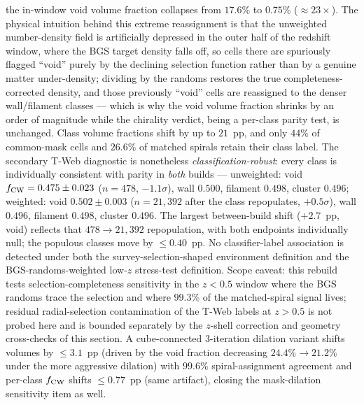 \documentclass[aps,prd,twocolumn,superscriptaddress,showpacs,preprintnumbers,nofootinbib,longbibliography,floatfix]{revtex4-2}
\begin{document}
the in-window void volume fraction collapses from $17.6\%$ to $0.75\%$
(${\approx}23\times$). The physical intuition behind this extreme
reassignment is that the unweighted number-density field is artificially
depressed in the outer half of the redshift window, where the BGS target
density falls off, so cells there are spuriously flagged ``void'' purely
by the declining selection function rather than by a genuine matter
under-density; dividing by the randoms restores the true completeness-
corrected density, and those previously ``void'' cells are reassigned to
the denser wall/filament classes --- which is why the void volume
fraction shrinks by an order of magnitude while the chirality verdict,
being a per-class parity test, is unchanged. Class volume fractions shift by up to $21$~pp,
and only $44\%$ of common-mask cells and $26.6\%$ of matched spirals
retain their class label. The secondary T-Web diagnostic is nonetheless
\emph{classification-robust}: every class is individually consistent
with parity in \emph{both} builds --- unweighted: void
$f_{\rm CW} = 0.475 \pm 0.023$ ($n=478$, $-1.1\sigma$), wall $0.500$,
filament $0.498$, cluster $0.496$; weighted: void $0.502 \pm 0.003$
($n = 21{,}392$ after the class repopulates, $+0.5\sigma$), wall
$0.496$, filament $0.498$, cluster $0.496$. The largest between-build
shift ($+2.7$~pp, void) reflects that $478 \to 21{,}392$ repopulation,
with both endpoints individually null; the populous classes move by
$\le 0.40$~pp. No classifier-label association is detected
under both the survey-selection-shaped environment definition and the
BGS-randoms-weighted low-$z$ stress-test definition. Scope caveat: this rebuild tests
selection-completeness sensitivity in the $z<0.5$ window where the BGS
randoms trace the selection and where $99.3\%$ of the matched-spiral
signal lives; residual radial-selection contamination of the T-Web
labels at $z>0.5$ is not probed here and is bounded separately by the
$z$-shell correction and geometry cross-checks of this section. A
cube-connected 3-iteration dilation variant shifts volumes by
$\le 3.1$~pp (driven by the void fraction decreasing
$24.4\% \to 21.2\%$ under the more aggressive dilation) with $99.6\%$
spiral-assignment agreement and per-class $f_{\rm CW}$ shifts
$\le 0.77$~pp (same artifact), closing the mask-dilation sensitivity
item as well.
\end{document}
